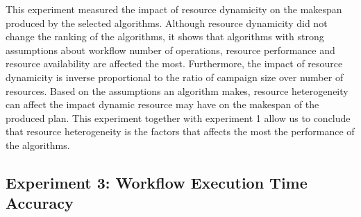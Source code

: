 This experiment measured the impact of resource dynamicity on the makespan produced by the selected algorithms.
Although resource dynamicity did not change the ranking of the algorithms, it shows that algorithms with strong assumptions about workflow number of operations, resource performance and resource availability are affected the most.
Furthermore, the impact of resource dynamicity is inverse proportional to the ratio of campaign size over number of resources.
Based on the assumptions an algorithm makes, resource heterogeneity can affect the impact dynamic resource may have on the makespan of the produced plan.
This experiment together with experiment 1 allow us to conclude that resource heterogeneity is the factors that affects the most the performance of the algorithms.



\subsection{Experiment 3: Workflow Execution Time Accuracy}

